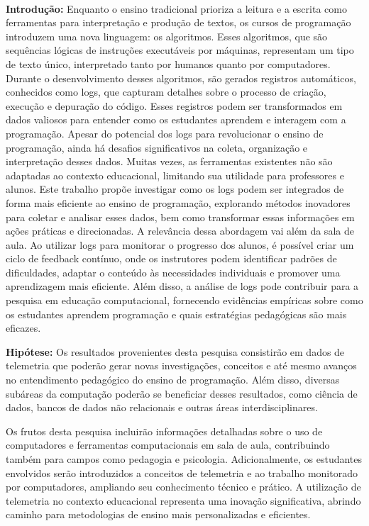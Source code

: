 \documentclass[10pt,a4paper]{article}
\begin{document}
\begin{enumerate}
\\ \noindent\textbf{Introdução:} 
Enquanto o ensino tradicional prioriza a leitura e a escrita como ferramentas para interpretação e produção de textos, os cursos de programação introduzem uma nova linguagem: os algoritmos. Esses algoritmos, que são sequências lógicas de instruções executáveis por máquinas, representam um tipo de texto único, interpretado tanto por humanos quanto por computadores. Durante o desenvolvimento desses algoritmos, são gerados registros automáticos, conhecidos como logs, que capturam detalhes sobre o processo de criação, execução e depuração do código. Esses registros podem ser transformados em dados valiosos para entender como os estudantes aprendem e interagem com a programação.
Apesar do potencial dos logs para revolucionar o ensino de programação, ainda há desafios significativos na coleta, organização e interpretação desses dados. Muitas vezes, as ferramentas existentes não são adaptadas ao contexto educacional, limitando sua utilidade para professores e alunos. Este trabalho propõe investigar como os logs podem ser integrados de forma mais eficiente ao ensino de programação, explorando métodos inovadores para coletar e analisar esses dados, bem como transformar essas informações em ações práticas e direcionadas.
A relevância dessa abordagem vai além da sala de aula. Ao utilizar logs para monitorar o progresso dos alunos, é possível criar um ciclo de feedback contínuo, onde os instrutores podem identificar padrões de dificuldades, adaptar o conteúdo às necessidades individuais e promover uma aprendizagem mais eficiente. Além disso, a análise de logs pode contribuir para a pesquisa em educação computacional, fornecendo evidências empíricas sobre como os estudantes aprendem programação e quais estratégias pedagógicas são mais eficazes.


\textbf{Hipótese:}
Os resultados provenientes desta pesquisa consistirão em dados de telemetria que poderão gerar novas investigações, conceitos e até mesmo avanços no entendimento pedagógico do ensino de programação. Além disso, diversas subáreas da computação poderão se beneficiar desses resultados, como ciência de dados, bancos de dados não relacionais e outras áreas interdisciplinares. 

Os frutos desta pesquisa incluirão informações detalhadas sobre o uso de computadores e ferramentas computacionais em sala de aula, contribuindo também para campos como pedagogia e psicologia. Adicionalmente, os estudantes envolvidos serão introduzidos a conceitos de telemetria e ao trabalho monitorado por computadores, ampliando seu conhecimento técnico e prático. A utilização de telemetria no contexto educacional representa uma inovação significativa, abrindo caminho para metodologias de ensino mais personalizadas e eficientes.


\end{enumerate}
\end{document}
